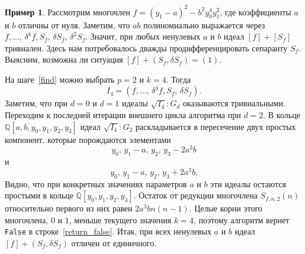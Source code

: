 \documentclass[11pt]{article}
\theoremstyle{plain}
\theoremstyle{definition}
\newtheorem{example}[theorem3]{Пример}
\theoremstyle{remark}
\begin{document}
\begin{example}
Рассмотрим многочлен $f = (y_1-a)^2 - b^2 y_0^4 y_1^2$,
где коэффициенты $a$ и $b$ отличны от нуля.
Заметим, что $ab$
полиномиально выражается через $f, \ldots, \,\delta^4 f, S_f, \,\delta {S_f}, \,\delta^2 {S_f}$.
Значит, при любых ненулевых $a$ и $b$ идеал $[f] + [S_f]$ тривиален.
Здесь нам потребовалось дважды продифференцировать сепаранту $S_f$.
Выясним, возможна ли ситуация $[f] + (S_f, \delta {S_f}) = (1)$.

На шаге~\ref{find} можно выбрать $p = 2$ и $k=4$.
Тогда
$$
 I_4 = (f, \ldots, \,\delta^4 f, S_f, \,\delta {S_f}).
$$
Заметим, что при $d=0$ и $d=1$ идеалы $\sqrt{I_4}:G_d$ оказываются тривиальными.
Переходим к последней итерации внешнего цикла алгоритма при $d=2$.
В кольце $\mathbb{Q}[a,b,y_0,y_1,y_2,y_3]$
идеал $\sqrt{I_4}:G_2$ раскладывается в пересечение двух простых компонент, которые порождаются элементами
$$
 y_0, \, y_1 - a, \, y_2, \, y_3 - 2 a^3 b
$$
и
$$
 y_0, \, y_1 - a, \, y_2, \, y_3 + 2 a^3 b.
$$
Видно, что при конкретных значениях параметров $a$ и $b$
эти идеалы остаются простыми в кольце $\mathbb{Q}[y_0, y_1, y_2, y_3]$.
Остаток от редукции многочлена $S_{f,n,2}(n)$
относительно первого из них равен $2a^3 b n(n-1)$.
Целые корни этого многочлена, $0$ и $1$, меньше текущего значения $k=4$,
поэтому алгоритм вернет \verb'False' в строке~\ref{return_false}.
Итак, при всех ненулевых $a$ и $b$ идеал $[f] + (S_f, \delta {S_f})$ отличен от единичного.
\end{example}
\end{document}
